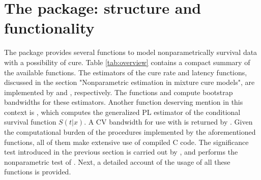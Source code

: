 \section{The  package: structure and functionality} 
\label{sec:NPcure}

The  package provides several functions to model nonparametrically survival data with a possibility of cure. Table \ref{tab:overview} contains a compact summary of the available functions. The estimators of the cure rate and latency functions, discussed in the section "Nonparametric estimation in mixture cure models", are implemented by  and , respectively. The functions  and  compute bootstrap bandwidths for these estimators. Another function deserving mention in this context is , which computes the generalized PL estimator of the conditional survival function $S\left(t|x \right)$. A CV bandwidth for use with  is returned by . Given the computational burden of the procedures implemented by the aforementioned functions, all of them make extensive use of compiled C code. The significance test introduced in the previous section is carried out by , and  performs the nonparametric test of \cite{Maller1}. Next, a detailed account of the usage of all these functions is provided.
